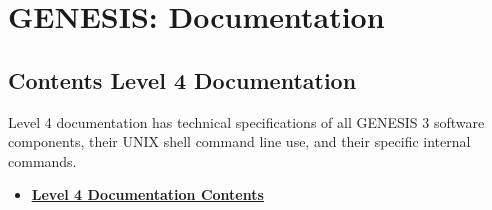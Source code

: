 \documentclass[12pt]{article}
\begin{document}
\section*{GENESIS: Documentation}

\subsection*{Contents Level 4 Documentation}


Level 4 documentation has technical specifications of all GENESIS 3
software components, their UNIX shell command line use, and their
specific internal commands.

\begin{itemize}

\item \href{../contents-level4/contents-level4.pdf}{\bf \underline{Level 4 Documentation Contents}}


\end{itemize}

\end{document}
